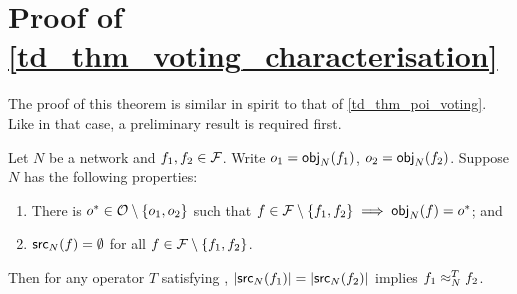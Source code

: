\section{Proof of \cref{td_thm_voting_characterisation}}

The proof of this theorem is similar in spirit to that of
\cref{td_thm_poi_voting}. Like in that case, a preliminary result is required
first.

\begin{lemma}
\label{td_lemma_voting_characterisation_lemma}
Let $N$ be a network and $f_1, f_2 \in \mathcal{F}$. Write $o_1 = \mathsf{obj}_{N}(f_1)$, $o_2
= \mathsf{obj}_N(f_2)$. Suppose $N$ has the following properties:

\begin{enumerate}
    \item There is $o^* \in \mathcal{O} \setminus \{o_1, o_2\}$ such that $f \in \mathcal{F}
          \setminus \{f_1, f_2\} \implies \mathsf{obj}_{N}(f) = o^*$; and

    \item $\mathsf{src}_{N}(f) = \emptyset$ for all $f \in \mathcal{F} \setminus \{f_1, f_2\}$.

\end{enumerate}

    Then for any operator $T$ satisfying \symmetry{}, $|\mathsf{src}_{N}(f_1)| =
|\mathsf{src}_{N}(f_2)|$ implies $f_1 \approx_{N}^T f_2$.
\end{lemma}


